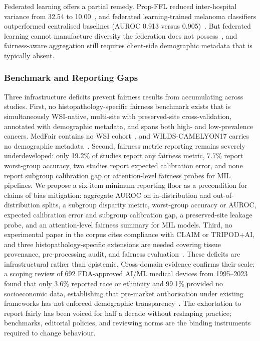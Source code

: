 Federated learning offers a partial remedy. Prop-FFL reduced inter-hospital variance from 32.54 to 10.00~\citep{hosseini2023proportionally}, and federated learning-trained melanoma classifiers outperformed centralised baselines (AUROC 0.913 versus 0.905)~\citep{haggenmuller2024federated}. But federated learning cannot manufacture diversity the federation does not possess~\citep{celi2022sources}, and fairness-aware aggregation still requires client-side demographic metadata that is typically absent.

\subsubsection{Benchmark and Reporting Gaps}
\label{sec:discussion:gaps}
Three infrastructure deficits prevent fairness results from accumulating across studies. First, no histopathology-specific fairness benchmark exists that is simultaneously WSI-native, multi-site with preserved-site cross-validation, annotated with demographic metadata, and spans both high- and low-prevalence cancers. MedFair contains no WSI cohort~\citep{zong2023medfair}, and WILDS-CAMELYON17 carries no demographic metadata~\citep{koh2021wilds, rui2025ethics}. Second, fairness metric reporting remains severely underdeveloped: only 19.2\% of studies report any fairness metric, 7.7\% report worst-group accuracy, two studies report expected calibration error, and none report subgroup calibration gap or attention-level fairness probes for MIL pipelines. We propose a six-item minimum reporting floor as a precondition for claims of bias mitigation: aggregate AUROC on in-distribution and out-of-distribution splits, a subgroup disparity metric, worst-group accuracy or AUROC, expected calibration error and subgroup calibration gap, a preserved-site leakage probe, and an attention-level fairness summary for MIL models. Third, no experimental paper in the corpus cites compliance with CLAIM or TRIPOD+AI, and three histopathology-specific extensions are needed covering tissue provenance, pre-processing audit, and fairness evaluation~\citep{sounderajah2021stardai, howard2021site, komen2024batch}. These deficits are infrastructural rather than epistemic. Cross-domain evidence confirms their scale: a scoping review of 692 FDA-approved AI/ML medical devices from 1995--2023 found that only 3.6\% reported race or ethnicity and 99.1\% provided no socioeconomic data, establishing that pre-market authorisation under existing frameworks has not enforced demographic transparency~\citep{muralidharan2024fda}. The exhortation to report fairly has been voiced for half a decade without reshaping practice; benchmarks, editorial policies, and reviewing norms are the binding instruments required to change behaviour. 

